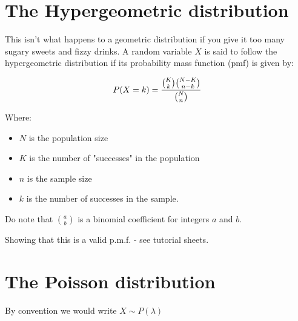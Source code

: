 \documentclass[12pt]{extbook}
\begin{document}







\section{The Hypergeometric distribution}

This isn't what happens to a geometric distribution if you give it too many sugary sweets and fizzy drinks.   A random variable $X$ is said to follow the hypergeometric distribution if its probability mass function (pmf) is given by:

$$P(X=k) = {{{K \choose k} {{N-K} \choose {n-k}}}\over {N \choose n}}$$

Where:
\begin{itemize}
\item    $N$ is the population size
\item $K$ is the number of "successes" in the population
\item $n$ is the sample size
\item $k$ is the number of successes in the sample.
\end{itemize}
Do note that ${a \choose b}$ is a binomial coefficient for integers $a$ and $b$.


Showing that this is a valid p.m.f. - see tutorial sheets.




\section{The Poisson distribution}

{\color{green}By convention we would write $X \sim P(\lambda)$} 
\end{document}

